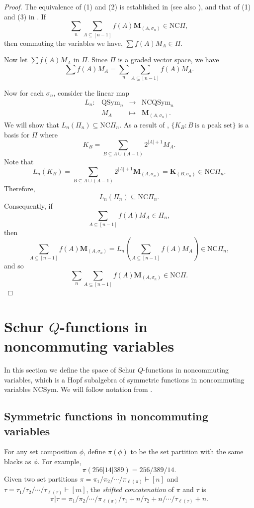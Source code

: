 \documentclass[11pt]{amsart}
\numberwithin{equation}{section}
\newcommand{\NCQSym}{\mathrm{NCQSym}}
\newcommand{\NCSym}{\mathrm{NCSym}}
\newcommand{\QSym}{\mathrm{QSym}}
\newcommand{\NCPeak}{\mathrm{NC}\Pi}
\newcommand{\bfM}{{\mathbf{M}}}
\newcommand{\bfK}{{\mathbf{K}}}
\begin{document}
\begin{proof}
The equivalence of (1) and (2) is established in \cite{BB85} (see also \cite[Theorem 2.2]{B14}), and that of (1) and (3) in \cite[Proposition 1.3]{B03}. If $$\sum_n\sum_{A\subseteq[n-1]}f(A)\bfM_{(A,\sigma_n)} \in \NCPeak,$$ then  commuting the variables we have, $\sum f(A)M_A\in \Pi.$  

Now let $\sum f(A)M_A$ in $\Pi$. Since $\Pi$ is a graded vector space, we have 
$$\sum f(A)M_A=\sum_n \sum_{A\subseteq [n-1]} f(A)M_A.$$


 Now for each $\sigma_n$, consider the linear map 
 $$\begin{array}{cccc}L_n: &\QSym_n &\rightarrow & \NCQSym_n\\
 & M_A & \mapsto & \bfM_{(A,\sigma_n)}.
 \end{array}$$
 We will show that $L_n(\Pi_n)\subseteq \NCPeak_n$. As a result of \cite[Proposition 2.2]{S97}, $\{K_B: B~\text{is a peak set}\}$ is a basis for $\Pi$ where 
 $$K_B=\sum_{B\subseteq A\cup(A-1)}2^{|A|+1}M_A.$$ Note that 
 $$L_n(K_B)=\sum_{B\subseteq A\cup(A-1)}2^{|A|+1}\bfM_{(A,\sigma_n)}= \bfK_{(B,\sigma_n)} \in \NCPeak_n.$$ Therefore, 
 $$L_n(\Pi_n)\subseteq \NCPeak_n.$$
 Consequently, if $$\sum_{A\subseteq[n-1]}f(A)M_A\in\Pi_n,$$ then $$\sum_{A\subseteq[n-1]}f(A)\bfM_{(A,\sigma_n)} =L_n\left(\sum_{A\subseteq[n-1]}f(A)M_A\right)  \in \NCPeak_n,$$ and so  
 $$\sum_n\sum_{A\subseteq[n-1]}f(A)\bfM_{(A,\sigma_n)} \in \NCPeak.$$
\end{proof}



\section{Schur $Q$-functions in noncommuting variables}\label{Sec:NCSym} In this section we define the space of Schur $Q$-functions in noncommuting variables, which is a Hopf subalgebra of symmetric functions in noncommuting variables $\NCSym$. We will follow notation from \cite{R04}.



\subsection{Symmetric functions in noncommuting variables}\label{sec:ncsym} For any set composition $\phi$, define $\pi(\phi)$ to be the set partition with the same blacks as $\phi$. For example, 
$$\pi(256|14|389)=256/389/14.$$
Given two set partitions $\pi=\pi_1/\pi_2/\cdots/\pi_{\ell(\pi)}\vdash [n]$ and $\tau=\tau_1/\tau_2/\cdots/\tau_{\ell(\tau)}\vdash [m]$, the \emph{shifted concatenation} of $\pi$ and $\tau$ is  
$$\pi|\tau=\pi_1/\pi_2/\cdots/\pi_{\ell(\pi)}/\tau_1+n/\tau_2+n/\cdots/\tau_{\ell(\tau)}+n.$$  
\end{document}
